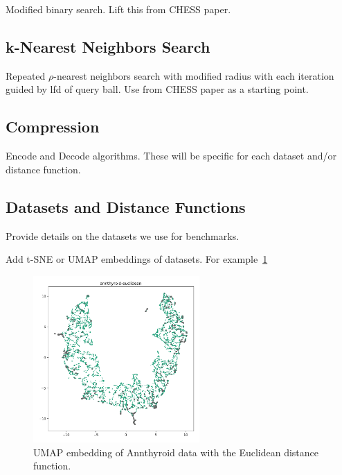 Modified binary search.
Lift this from CHESS paper.

\subsection{k-Nearest Neighbors Search}
\label{subsubsec:methods:algorithms:knn-search}

Repeated $\rho$-nearest neighbors search with modified radius with each iteration guided by lfd of query ball.
Use from CHESS paper as a starting point.

\subsection{Compression}
\label{subsubsec:methods:algorithms:compression}

Encode and Decode algorithms.
These will be specific for each dataset and/or distance function.



\subsection{Datasets and Distance Functions}
\label{subsec:methods:datasets-and-distance-functions}

Provide details on the datasets we use for benchmarks.

Add t-SNE or UMAP embeddings of datasets. For example~\ref{fig:discussion:umap-annthyroid-euclidean}

\begin{figure}[ht!]
    \centering
    \includegraphics[width=2.5in]{images/umaps/annthyroid-euclidean-umap2d.png}
    \caption{UMAP embedding of Annthyroid data with the Euclidean distance function.}
    \label{fig:discussion:umap-annthyroid-euclidean}
\end{figure}

